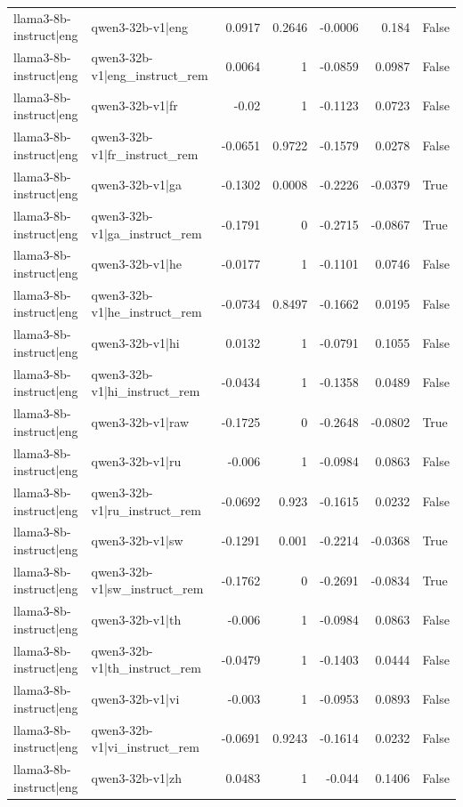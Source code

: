 \begin{table}
\begin{tabular}{l l r r r r l}
llama3-8b-instruct|eng & qwen3-32b-v1|eng & 0.0917 & 0.2646 & -0.0006 & 0.184 & False \\
llama3-8b-instruct|eng & qwen3-32b-v1|eng_instruct_rem & 0.0064 & 1 & -0.0859 & 0.0987 & False \\
llama3-8b-instruct|eng & qwen3-32b-v1|fr & -0.02 & 1 & -0.1123 & 0.0723 & False \\
llama3-8b-instruct|eng & qwen3-32b-v1|fr_instruct_rem & -0.0651 & 0.9722 & -0.1579 & 0.0278 & False \\
llama3-8b-instruct|eng & qwen3-32b-v1|ga & -0.1302 & 0.0008 & -0.2226 & -0.0379 & True \\
llama3-8b-instruct|eng & qwen3-32b-v1|ga_instruct_rem & -0.1791 & 0 & -0.2715 & -0.0867 & True \\
llama3-8b-instruct|eng & qwen3-32b-v1|he & -0.0177 & 1 & -0.1101 & 0.0746 & False \\
llama3-8b-instruct|eng & qwen3-32b-v1|he_instruct_rem & -0.0734 & 0.8497 & -0.1662 & 0.0195 & False \\
llama3-8b-instruct|eng & qwen3-32b-v1|hi & 0.0132 & 1 & -0.0791 & 0.1055 & False \\
llama3-8b-instruct|eng & qwen3-32b-v1|hi_instruct_rem & -0.0434 & 1 & -0.1358 & 0.0489 & False \\
llama3-8b-instruct|eng & qwen3-32b-v1|raw & -0.1725 & 0 & -0.2648 & -0.0802 & True \\
llama3-8b-instruct|eng & qwen3-32b-v1|ru & -0.006 & 1 & -0.0984 & 0.0863 & False \\
llama3-8b-instruct|eng & qwen3-32b-v1|ru_instruct_rem & -0.0692 & 0.923 & -0.1615 & 0.0232 & False \\
llama3-8b-instruct|eng & qwen3-32b-v1|sw & -0.1291 & 0.001 & -0.2214 & -0.0368 & True \\
llama3-8b-instruct|eng & qwen3-32b-v1|sw_instruct_rem & -0.1762 & 0 & -0.2691 & -0.0834 & True \\
llama3-8b-instruct|eng & qwen3-32b-v1|th & -0.006 & 1 & -0.0984 & 0.0863 & False \\
llama3-8b-instruct|eng & qwen3-32b-v1|th_instruct_rem & -0.0479 & 1 & -0.1403 & 0.0444 & False \\
llama3-8b-instruct|eng & qwen3-32b-v1|vi & -0.003 & 1 & -0.0953 & 0.0893 & False \\
llama3-8b-instruct|eng & qwen3-32b-v1|vi_instruct_rem & -0.0691 & 0.9243 & -0.1614 & 0.0232 & False \\
llama3-8b-instruct|eng & qwen3-32b-v1|zh & 0.0483 & 1 & -0.044 & 0.1406 & False \\

\end{tabular}
\end{table}
